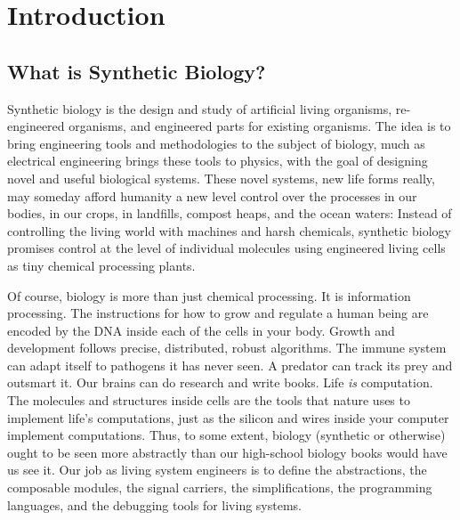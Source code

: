 \chapter{Introduction}

\section{What is Synthetic Biology?}


Synthetic biology is the design and study of artificial living
organisms, re-engineered organisms, and engineered parts for existing
organisms. The idea is to bring engineering tools and methodologies to
the subject of biology, much as electrical engineering brings these
tools to physics, with the goal of designing novel and useful
biological systems. These novel systems, new life forms really, may
someday afford humanity a new level control over the processes in our
bodies, in our crops, in landfills, compost heaps, and the ocean
waters: Instead of controlling the living world with machines and
harsh chemicals, synthetic biology promises control at the level of
individual molecules using engineered living cells as tiny chemical
processing plants.

Of course, biology is more than just chemical processing. It is
information processing. The instructions for how to grow and regulate
a human being are encoded by the DNA inside each of the cells in your
body. Growth and development follows precise, distributed, robust
algorithms. The immune system can adapt itself to pathogens it has
never seen. A predator can track its prey and outsmart it. Our brains
can do research and write books. Life {\em is} computation. The
molecules and structures inside cells are the tools that nature uses
to implement life's computations, just as the silicon and wires inside
your computer implement computations. Thus, to some
extent, biology (synthetic or otherwise) ought to be seen more
abstractly than our high-school biology books would have us see
it. Our job as living system engineers is to define the abstractions,
the composable modules, the signal carriers, the simplifications, the
programming languages, and the debugging tools for living systems.

